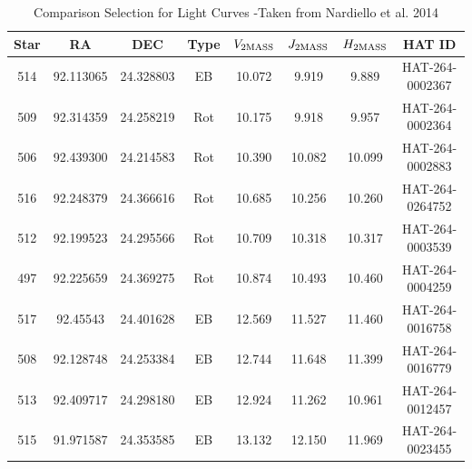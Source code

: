 \documentclass[11pt,letterpaper]{book} %
\begin{document}
\begin{table}[]
\centering
\label{my-label}
\begin{tabular}{|c|c|c|c|c|c|c|c|}
\hline
\textbf{Star} & \textbf{RA} & \textbf{DEC} & \textbf{Type} & \textbf{$V_{\rm 2MASS}$} & \textbf{$J_{\rm 2MASS}$} & \textbf{$H_{\rm 2MASS}$} & \textbf{HAT ID} \\ \hline
514           & 92.113065   & 24.328803        & EB            & 10.072            & 9.919             & 9.889             & HAT-264-0002367 \\ \hline
509           & 92.314359   & 24.258219        & Rot           & 10.175            & 9.918             & 9.957             & HAT-264-0002364 \\ \hline
506           & 92.439300   & 24.214583        & Rot           & 10.390            & 10.082            & 10.099            & HAT-264-0002883 \\ \hline
516           & 92.248379   & 24.366616        & Rot           & 10.685            & 10.256            & 10.260            & HAT-264-0264752 \\ \hline
512           & 92.199523   & 24.295566        & Rot           & 10.709            & 10.318            & 10.317            & HAT-264-0003539 \\ \hline
497           & 92.225659   & 24.369275        & Rot           & 10.874            & 10.493            & 10.460            & HAT-264-0004259 \\ \hline
517           & 92.45543    & 24.401628        & EB            & 12.569            & 11.527            & 11.460            & HAT-264-0016758 \\ \hline
508           & 92.128748   & 24.253384       & EB   		   & 12.744            & 11.648             & 11.399             & HAT-264-0016779 \\ \hline
513           & 92.409717   & 24.298180        & EB            & 12.924             & 11.262              & 10.961             & HAT-264-0012457 \\ \hline
515           & 91.971587   & 24.353585       & EB             & 13.132 & 12.150	           & 11.969              & HAT-264-0023455 \\ \hline

\end{tabular}
\caption{Comparison Selection for Light Curves  -Taken from Nardiello et al. 2014}
\label{Nard}
\end{table}
\end{document}
